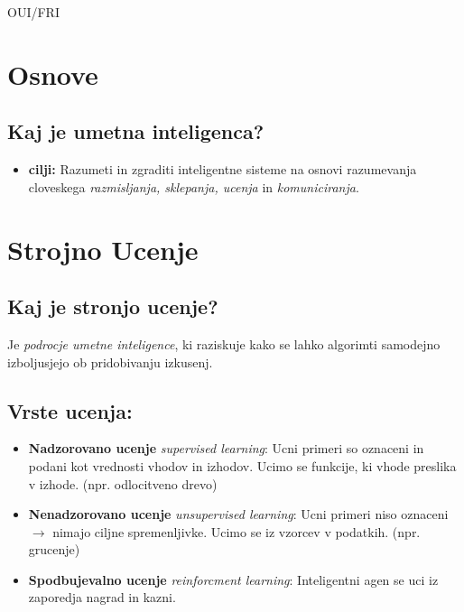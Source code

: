 \documentclass{article}
\begin{document}
\begin{center}
	{\small OUI/FRI \par}
\end{center}


\begin{multicols}{2}

	\section{Osnove}

	\subsection{Kaj je umetna inteligenca?}
	\begin{itemize}
		\item  \textbf{cilji:} Razumeti in zgraditi inteligentne sisteme na osnovi razumevanja
		      cloveskega \textit{razmisljanja, sklepanja, ucenja} in \textit{komuniciranja}.
	\end{itemize}

	\section{Strojno Ucenje}

	\subsection{Kaj je stronjo ucenje?}
	Je \textit{podrocje umetne inteligence}, ki raziskuje kako se lahko algorimti samodejno izboljusjejo ob pridobivanju izkusenj.

	\subsection{Vrste ucenja:}

	\begin{itemize}
		\item \textbf{Nadzorovano ucenje} \textit{supervised learning}:
		      Ucni primeri so oznaceni in podani kot vrednosti vhodov in izhodov.
		      Ucimo se funkcije, ki vhode preslika v izhode. (npr. odlocitveno drevo)
		\item \textbf{Nenadzorovano ucenje} \textit{unsupervised learning}:
		      Ucni primeri niso oznaceni $\rightarrow$ nimajo ciljne spremenljivke. Ucimo
		      se iz vzorcev v podatkih. (npr. grucenje)
		\item \textbf{Spodbujevalno ucenje} \textit{reinforcment learning}:
		      Inteligentni agen se uci iz zaporedja nagrad in kazni.
	\end{itemize}


\end{multicols}
\end{document}
